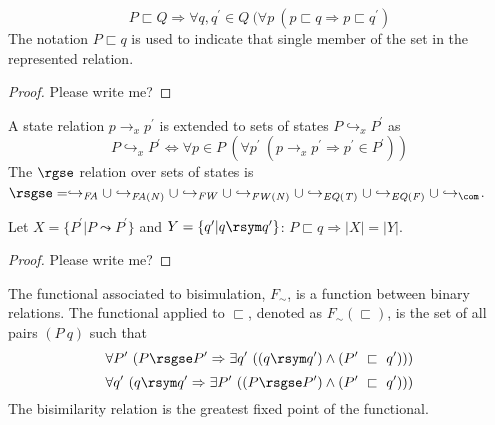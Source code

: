 \begin{lemma}
\label{lem:unique}
$$
P \sqsubset Q \Rightarrow \forall q,q^\prime \in Q\ (\forall p\ (p \sqsubset q \Rightarrow p \sqsubset q^\prime)
$$
The notation $P \sqsubset q$ is used to indicate that single member of
the set in the represented relation.
\end{lemma}
\begin{proof}
Please write me?
\end{proof}
\begin{definition}
\label{def:meta}
A state relation $p \rightarrow_x p^\prime$ is extended to sets of states $P \hookrightarrow_x P^\prime$ as
$$
P \hookrightarrow_x P^\prime \Longleftrightarrow \forall p \in P\ (\forall p^\prime\ (p \rightarrow_x p^\prime \Rightarrow p^\prime \in P^\prime))
$$
The $\rgse$ relation over sets of states is $\rsgse = \hookrightarrow_\mathit{FA} \cup \hookrightarrow_\mathit{FA(N)} \cup \hookrightarrow_\mathit{FW} \cup \hookrightarrow_\mathit{FW(N)} \cup \hookrightarrow_\mathit{EQ(T)} \cup \hookrightarrow_\mathit{EQ(F)} \cup \hookrightarrow_\com$.%
\end{definition}

\begin{lemma}
\label{lem:succCount}
Let $X = \{P^\prime | P \leadsto P^\prime\}$ and $Y = \{q^\prime | q
\rsym q^\prime\}$: $P \sqsubset q \Rightarrow |X| = |Y|$.
\end{lemma}
\begin{proof}
Please write me?
\end{proof}

\begin{definition}
\label{bisimulation}
The functional associated to bisimulation,  $F_\sim$, is a function between binary relations. The functional applied to $\sqsubset$, denoted as $F_\sim(\sqsubset)$, is the set of all pairs
$(P\ q)$ such that
\begin{equation}
\label{eqn:BisimulationForwards}
\forall P^\prime\ ( P \rsgse P^\prime \Rightarrow \exists q^\prime\ ( (q \rsym q^\prime )\wedge (P^\prime\ \sqsubset\ q^\prime )))
\end{equation}
\begin{equation}
\label{eqn:BisimulationBackwards}
\forall q^\prime\ ( q \rsym q^\prime\Rightarrow \exists P^\prime\ ( (P \rsgse P^\prime )\wedge (P^\prime\ \sqsubset\ q^\prime )))
\end{equation}
The bisimilarity relation is the greatest fixed point of the functional.
\end{definition}

